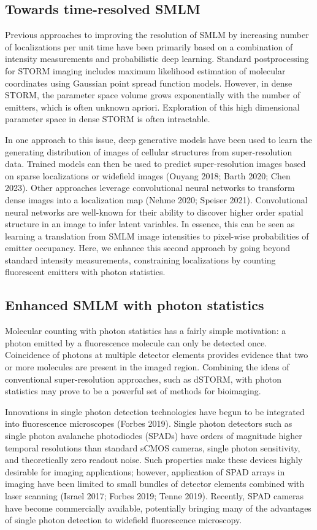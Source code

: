 \documentclass{ucetd}
\begin{document}
\subsection{Towards time-resolved SMLM}

Previous approaches to improving the resolution of SMLM by increasing number of localizations per unit time have been primarily based on a combination of intensity measurements and probabilistic deep learning. Standard postprocessing for STORM imaging includes maximum likelihood estimation of molecular coordinates using Gaussian point spread function models. However, in dense STORM, the parameter space volume grows exponentially with the number of emitters, which is often unknown apriori. Exploration of this high dimensional parameter space in dense STORM is often intractable. 

In one approach to this issue, deep generative models have been used to learn the generating distribution of images of cellular structures from super-resolution data. Trained models can then be used to predict super-resolution images based on sparse localizations or widefield images (Ouyang 2018; Barth 2020; Chen 2023). Other approaches leverage convolutional neural networks to transform dense images into a localization map (Nehme 2020; Speiser 2021). Convolutional neural networks are well-known for their ability to discover higher order spatial structure in an image to infer latent variables. In essence, this can be seen as learning a translation from SMLM image intensities to pixel-wise probabilities of emitter occupancy. Here, we enhance this second approach by going beyond standard intensity measurements, constraining localizations by counting fluorescent emitters with photon statistics.

\subsection{Enhanced SMLM with photon statistics}

Molecular counting with photon statistics has a fairly simple motivation: a photon emitted by a fluorescence molecule can only be detected once. Coincidence of photons at multiple detector elements provides evidence that two or more molecules are present in the imaged region. Combining the ideas of conventional super-resolution approaches, such as dSTORM, with photon statistics may prove to be a powerful set of methods for bioimaging.

Innovations in single photon detection technologies have begun to be integrated into fluorescence microscopes (Forbes 2019). Single photon detectors such as single photon avalanche photodiodes (SPADs) have orders of magnitude higher temporal resolutions than standard sCMOS cameras, single photon sensitivity, and theoretically zero readout noise. Such properties make these devices highly desirable for imaging applications; however, application of SPAD arrays in imaging have been limited to small bundles of detector elements combined with laser scanning (Israel 2017; Forbes 2019; Tenne 2019). Recently, SPAD cameras have become commercially available, potentially bringing many of the advantages of single photon detection to widefield fluorescence microscopy. 
\end{document}
